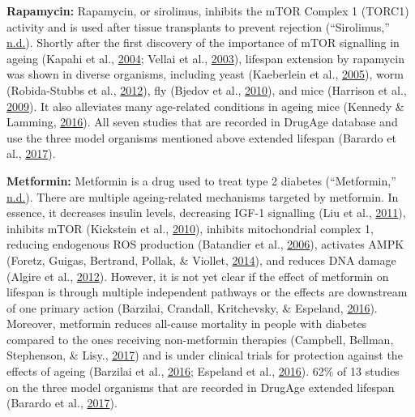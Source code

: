 \documentclass[12pt,twoside]{unicam}
\begin{document}
\textbf{Rapamycin:} Rapamycin, or sirolimus, inhibits the mTOR Complex 1 (TORC1) activity and is used after tissue transplants to prevent rejection (``Sirolimus,'' \protect\hyperlink{ref-Sirolimus}{n.d.}). Shortly after the first discovery of the importance of mTOR signalling in ageing (Kapahi et al., \protect\hyperlink{ref-Kapahi2004}{2004}; Vellai et al., \protect\hyperlink{ref-Vellai2003}{2003}), lifespan extension by rapamycin was shown in diverse organisms, including yeast (Kaeberlein et al., \protect\hyperlink{ref-Kaeberlein2005}{2005}), worm (Robida-Stubbs et al., \protect\hyperlink{ref-Robida-Stubbs2012}{2012}), fly (Bjedov et al., \protect\hyperlink{ref-Bjedov2010}{2010}), and mice (Harrison et al., \protect\hyperlink{ref-Harrison2009}{2009}). It also alleviates many age-related conditions in ageing mice (Kennedy \& Lamming, \protect\hyperlink{ref-Kennedy2016}{2016}). All seven studies that are recorded in DrugAge database and use the three model organisms mentioned above extended lifespan (Barardo et al., \protect\hyperlink{ref-Barardo2017}{2017}).

\textbf{Metformin:} Metformin is a drug used to treat type 2 diabetes (``Metformin,'' \protect\hyperlink{ref-Metformin}{n.d.}). There are multiple ageing-related mechanisms targeted by metformin. In essence, it decreases insulin levels, decreasing IGF-1 signalling (Liu et al., \protect\hyperlink{ref-Liu2011}{2011}), inhibits mTOR (Kickstein et al., \protect\hyperlink{ref-Kickstein2010}{2010}), inhibits mitochondrial complex 1, reducing endogenous ROS production (Batandier et al., \protect\hyperlink{ref-Batandier2006}{2006}), activates AMPK (Foretz, Guigas, Bertrand, Pollak, \& Viollet, \protect\hyperlink{ref-Foretz2014}{2014}), and reduces DNA damage (Algire et al., \protect\hyperlink{ref-Algire2012}{2012}). However, it is not yet clear if the effect of metformin on lifespan is through multiple independent pathways or the effects are downstream of one primary action (Barzilai, Crandall, Kritchevsky, \& Espeland, \protect\hyperlink{ref-Barzilai2016}{2016}). Moreover, metformin reduces all-cause mortality in people with diabetes compared to the ones receiving non-metformin therapies (Campbell, Bellman, Stephenson, \& Lisy., \protect\hyperlink{ref-Campbell2017}{2017}) and is under clinical trials for protection against the effects of ageing (Barzilai et al., \protect\hyperlink{ref-Barzilai2016}{2016}; Espeland et al., \protect\hyperlink{ref-Espeland2016}{2016}). 62\% of 13 studies on the three model organisms that are recorded in DrugAge extended lifespan (Barardo et al., \protect\hyperlink{ref-Barardo2017}{2017}).
\end{document}
